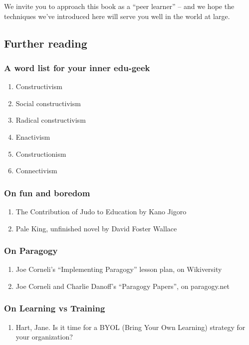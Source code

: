 We invite you to approach this book as a ``peer learner'' -- and we hope
the techniques we've introduced here will serve you well in the world at
large.

\subsection{Further reading}

\subsubsection{A word list for your inner edu-geek}

\begin{enumerate}
\item
  Constructivism
\item
  Social constructivism
\item
  Radical constructivism
\item
  Enactivism
\item
  Constructionism
\item
  Connectivism
\end{enumerate}
\subsubsection{On fun and boredom}

\begin{enumerate}
\item
  The Contribution of Judo to Education by Kano Jigoro
\item
  Pale King, unfinished novel by David Foster Wallace
\end{enumerate}
\subsubsection{On Paragogy}

\begin{enumerate}
\item
  Joe Corneli's ``Implementing Paragogy'' lesson plan, on Wikiversity
\item
  Joe Corneli and Charlie Danoff's ``Paragogy Papers'', on paragogy.net
\end{enumerate}
\subsubsection{On Learning vs Training}

\begin{enumerate}
\item
  Hart, Jane. Is it time for a BYOL (Bring Your Own Learning) strategy
  for your organization?
\end{enumerate}
